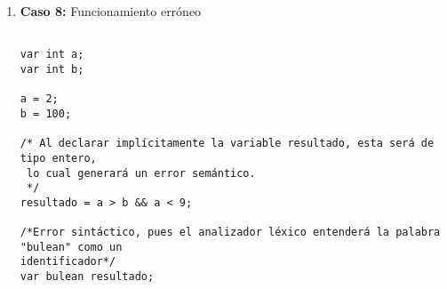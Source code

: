 \begin{enumerate}
\begin{tcolorbox}[title={Código fuente}, colback=white]
\begin{lstlisting}
var boolean este;
var int programa;
var int parece_correcto;

function boolean sin_emb4rgo   (void) {
    input este;

}

var string programa;

programa = '¡Contiene múltiples errores!';



/*
Finalizamos con un comentario sin cerrar

que generará un error léxico
        \end{lstlisting}
    \end{tcolorbox}

    \begin{tcolorbox}[title={Errores detectados}, colback=white]
        \begin{lstlisting}
(8:11) UE-0106: Un objeto tipo «boolean» no se puede usar con «input». «input» acepta variables de
 tipo «int» o «string».
 ->       input este;
                ^^^^
(7:10) UE-0101: El tipo de retorno de la función «sin_emb4rgo» («boolean») no coincide con el
devuelto («void»).
(12:12) UE-0000: El nombre de la variable a declarar ya está en uso.
 ->   var string programa;
                 ^^^^^^^^
(14:10) UE-0200: Los tipos a ambos lados de la asignación no coinciden. La variable es de tipo
«int», pero la expresión es «string».
 ->   programa = '¡Contiene múltiples errores!';
               ^^^^^^^^^^^^^^^^^^^^^^^^^^^^^^^^
(22:1) LE-0001: Fin de fichero inesperado. Se esperaba «*/» para cerrar el comentario de bloque.
 ->   �
      ^
Hay errores semánticos al procesar el programa.

        \end{lstlisting}
    \end{tcolorbox}





    \item \textbf{Caso 8:} Funcionamiento erróneo
    \begin{tcolorbox}[title={Código fuente}, colback=white]
        \begin{lstlisting}

var int a;
var int b;

a = 2;
b = 100;

/* Al declarar implícitamente la variable resultado, esta será de tipo entero,
 lo cual generará un error semántico.
 */
resultado = a > b && a < 9;

/*Error sintáctico, pues el analizador léxico entenderá la palabra "bulean" como un
identificador*/
var bulean resultado;
        \end{lstlisting}
    \end{tcolorbox}


\end{enumerate}
